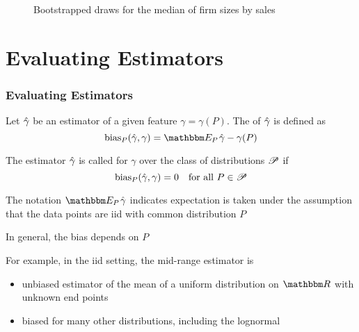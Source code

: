 \begin{frame}

    \begin{figure}
    \centering
    \caption{\label{f:firms_median} Bootstrapped draws for the 
                median of firm sizes by sales}
    \end{figure}

\end{frame}

\section{Evaluating Estimators}

\begin{frame}\frametitle{Evaluating Estimators}

    \vspace{2em}
    Let $\hat \gamma$ be an estimator of a given feature
    $\gamma = \gamma(P)$.  The  of $\hat \gamma$ is defined as 
    \begin{equation*}
        \label{eq:bias}
        \text{bias}_P(\hgamma, \gamma) = \EEP  \hgamma - \gamma(P)
    \end{equation*}
    
    \vspace{.7em}
    The estimator $\hat \gamma$ is called  for $\gamma$ over the
    class of distributions $\mathscr P$ if 
    \begin{equation*}
    \text{bias}_P(\hat \gamma, \gamma) = 0
    \quad \text{for all } P \in \mathscr P
    \end{equation*}
    
\end{frame}

\begin{frame}

    \vspace{2em}
    The notation $\EEP \hgamma$ indicates  expectation is taken under the
    assumption that the data points are {\sc iid} with common distribution $P$
    
    In general, the bias depends on $P$
    
    \vspace{.7em}
    For example, in the {\sc iid} setting,
    the mid-range estimator is
    \begin{itemize}
        \item unbiased estimator of the mean of a uniform distribution 
            on $\RR$ with unknown end points
        \item biased for many other distributions, including the lognormal  
    \end{itemize}
    
\end{frame}

